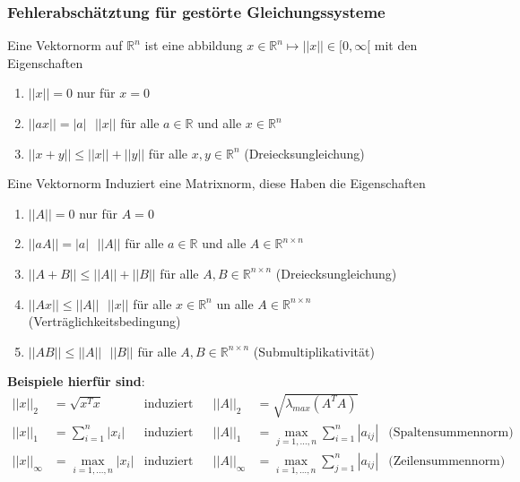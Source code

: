 \documentclass[
	ngerman,
	accentcolor=9c,%
	type=intern,
	marginpar=false
	]{tudapub}
\begin{document}
        \subsubsection{Fehlerabschätztung für gestörte Gleichungssysteme}
            \begin{definition}
                Eine Vektornorm auf $\mathbb{R}^n$ ist eine abbildung $x \in \mathbb{R}^n \mapsto ||x|| \in [0,\infty[$ mit den Eigenschaften
                \begin{enumerate}[label=\alph*)]
                    \item $||x|| = 0$ nur für $x = 0$
                    \item $||ax|| = |a|\mbox{ }||x||$ für alle $a \in \mathbb{R}$ und alle $x \in \mathbb{R}^n$
                    \item $||x+y|| \leq ||x|| + ||y||$ für alle $x,y \in \mathbb{R}^n$ (Dreiecksungleichung) 
                \end{enumerate}
            \end{definition}\newpage
            \begin{definition}
                Eine Vektornorm Induziert eine Matrixnorm, diese Haben die Eigenschaften
                \begin{enumerate}[label=\alph*)]
                    \item $||A|| = 0$ nur für $A = 0$
                    \item $||aA|| = |a|\mbox{ }||A||$ für alle $a \in \mathbb{R}$ und alle $A \in \mathbb{R}^{n \times n}$
                    \item $||A+B|| \leq ||A|| + ||B||$ für alle $A,B \in \mathbb{R}^{n\times n}$ (Dreiecksungleichung) 
                    \item $||Ax|| \leq ||A|| \mbox{ } ||x||$ für alle $x \in \mathbb{R}^n$ un alle $A \in \mathbb{R}^{n \times n}$ (Verträglichkeitsbedingung)
                    \item $||AB|| \leq ||A|| \mbox{ }||B||$ für alle $A,B \in \mathbb{R}^{n\times n}$ (Submultiplikativität)
                \end{enumerate}
                \textbf{Beispiele hierfür sind}:
                \begin{align*}
                    ||x||_2 &= \sqrt{x^Tx} & \text{induziert} &&||A||_2 &= \sqrt{\lambda_{max}(A^TA)}\\
                    ||x||_1 &= \sum^n_{i=1}|x_i| & \text{induziert} && ||A||_1 &= \max_{j=1,\dots,n} \sum^n_{i=1} |a_{ij}| & \text{(Spaltensummennorm)}\\
                    ||x||_\infty &= \max_{i=1,\dots,n}|x_i| & \text{induziert} && ||A||_\infty &= \max_{i=1,\dots,n} \sum^n_{j=1} |a_{ij}| & \text{(Zeilensummennorm)}\\
                \end{align*}
            \end{definition}
\end{document}
